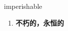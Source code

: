 
\begin{frame}
{\huge imperishable}
\begin{center}
\begin{enumerate}\Large
  \item \textbf{不朽的，永恒的}
\end{enumerate}
\end{center}
\end{frame}
